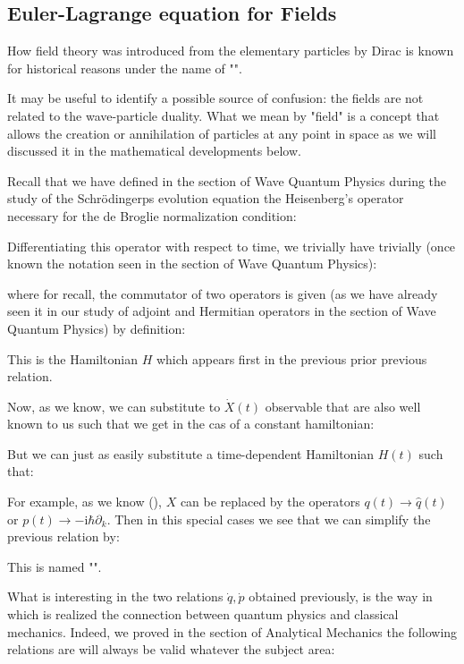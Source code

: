 	\pagebreak
	\subsection{Euler-Lagrange equation for Fields}
	How field theory was introduced from the elementary particles by Dirac is known for historical reasons under the name of "".

	It may be useful to identify a possible source of confusion: the fields are not related to the wave-particle duality. What we mean by "field" is a concept that allows the creation or annihilation of particles at any point in space as we will discussed it in the mathematical developments below.

	Recall that we have defined in the section of Wave Quantum Physics during the study of the Schrödingerps evolution equation the Heisenberg's operator necessary for the de Broglie normalization condition:
	
	Differentiating this operator with respect to time, we trivially have trivially (once known the notation seen in the section of Wave Quantum Physics):
	
	where for recall, the commutator of two operators is given (as we have already seen it in our study of adjoint and  Hermitian operators in the section of Wave Quantum Physics) by definition:
	
	This is the Hamiltonian $H$ which appears first in the previous prior previous relation.
	
	Now, as we know, we can substitute to $\dot{X}(t)$ observable that are also well known to us such that we get in the cas of a constant hamiltonian:
	
	But we can just as easily substitute a time-dependent Hamiltonian $H(t)$ such that:
	
	For example, as we know (), $X$ can be replaced by the operators $q(t)\rightarrow \hat{q}(t)$ or $p(t)\rightarrow -\mathrm{i}\hbar\partial_k$. Then in this special cases we see that we can simplify the previous relation by:
	
	This is named "". 
	
	What is interesting in the two relations $\dot{q},\dot{p}$ obtained previously, is the way in which is realized the connection between quantum physics and classical mechanics. Indeed, we proved in the section of Analytical Mechanics the following relations are will always be valid whatever the subject area:
	
